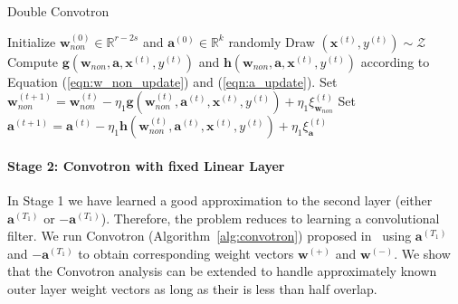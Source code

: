 \documentclass[11pt]{article}
\newcommand{\vect}[1]{\mathbf{#1}}
\newcommand{\inputdist}{\mathcal{Z}}
\newcommand{\simon}[1]{\textcolor{blue}{[Simon: #1]}}
\begin{document}
\begin{algorithm}[t]
   \caption{Double Convotron}
   \label{alg:doubleconvotron}
\begin{algorithmic}
   \State Initialize $\vect{w}^{(0)}_{non} \in \mathbb{R}^{r-2s}$ and $\vect{a}^{(0)} \in \mathbb{R}^{k}$ randomly
   \State Draw $(\vect{x}^{(t)}, y^{(t)}) \sim \inputdist$
   \State Compute $\vect{g}\left(\vect{w}_{non},\vect{a},\vect{x}^{(t)},y^{(t)}\right) $ and $\vect{h}\left(\vect{w}_{non},\vect{a},\vect{x}^{(t)},y^{(t)}\right)$ according to Equation (\ref{eqn:w_non_update}) and (\ref{eqn:a_update}).
   \State Set $\vect{w}_{non}^{(t+1)} = \vect{w}_{non}^{(t)} - \eta_1\vect{g}\left(\vect{w}_{non}^{(t)},\vect{a}^{(t)},\vect{x}^{(t)},y^{(t)}\right) + \eta_1 \xi_{\vect{w}_{non}}^{(t)}$
   \State Set $\vect{a}^{(t+1)} = \vect{a}^{(t)} -  \eta_1\vect{h}\left(\vect{w}_{non}^{(t)},\vect{a}^{(t)},\vect{x}^{(t)},y^{(t)}\right) + \eta_1 \xi_{\vect{a}}^{(t)}$
   \EndFor
   \State{Return $\vect{a}^{(T+1)}$}
\end{algorithmic}
\end{algorithm}\paragraph{Stage 2: Convotron with fixed Linear Layer}%
In Stage 1 we have learned a good approximation to the second layer (either $\vect{a}^{(T_1)}$ or $-\vect{a}^{(T_1)}$).
Therefore, the problem reduces to learning a convolutional filter.
We run Convotron (Algorithm~\ref{alg:convotron}) proposed in~\cite{goel2018learning} using $\vect{a}^{(T_1)}$ and $-\vect{a}^{(T_1)}$ to obtain corresponding weight vectors $\vect{w}^{(+)}$ and $\vect{w}^{(-)}$. We show that the Convotron analysis can be extended to handle approximately known outer layer weight vectors as long as their is less than half overlap.
\end{document}
